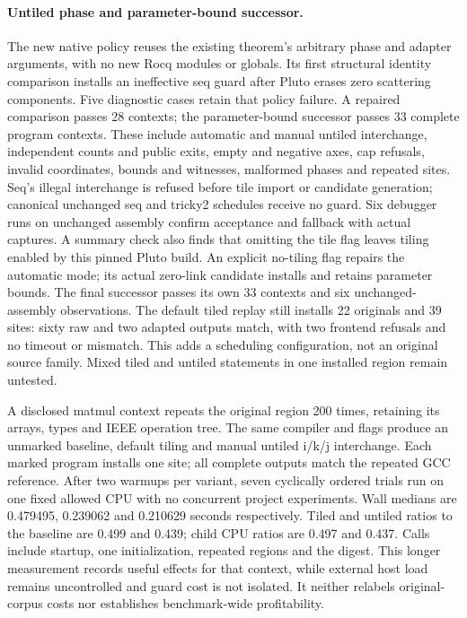 \paragraph{Untiled phase and parameter-bound successor.}
The new native policy reuses the existing theorem's arbitrary phase and adapter
arguments, with no new Rocq modules or globals. Its first structural identity
comparison installs an ineffective seq guard after Pluto erases zero scattering
components. Five diagnostic cases retain that policy failure. A repaired
comparison passes 28 contexts; the parameter-bound successor passes 33 complete
program contexts. These include automatic and manual untiled interchange,
independent counts and public exits, empty and negative axes, cap refusals,
invalid coordinates, bounds and witnesses, malformed phases and repeated sites.
Seq's illegal interchange is refused before tile import or candidate generation;
canonical unchanged seq and tricky2 schedules receive no guard. Six debugger
runs on unchanged assembly confirm acceptance and fallback with actual captures.
A summary check also finds that omitting the tile flag leaves tiling enabled by
this pinned Pluto build. An explicit no-tiling flag repairs the automatic mode;
its actual zero-link candidate installs and retains parameter bounds. The final
successor passes its own 33 contexts and six unchanged-assembly observations.
The default tiled replay still installs 22 originals and 39 sites: sixty raw
and two adapted outputs match, with two frontend refusals and no timeout or
mismatch. This adds a scheduling configuration, not an original source family.
Mixed tiled and untiled statements in one installed region remain untested.

A disclosed matmul context repeats the original region 200 times, retaining its
arrays, types and IEEE operation tree. The same compiler and flags produce an
unmarked baseline, default tiling and manual untiled i/k/j interchange. Each
marked program installs one site; all complete outputs match the repeated GCC
reference. After two warmups per variant, seven cyclically ordered trials run
on one fixed allowed CPU with no concurrent project experiments. Wall medians
are 0.479495, 0.239062 and 0.210629 seconds respectively. Tiled and untiled ratios
to the baseline are 0.499 and 0.439; child CPU ratios are 0.497 and 0.437.
Calls include startup, one initialization, repeated regions and the digest.
This longer measurement records useful effects for that context, while external
host load remains uncontrolled and guard cost is not isolated. It neither
relabels original-corpus costs nor establishes benchmark-wide profitability.

